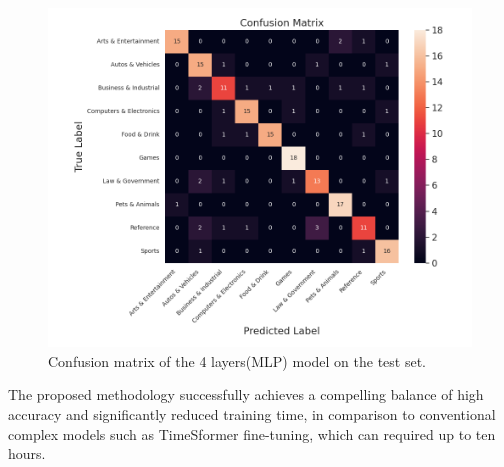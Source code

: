 \begin{figure}[t]
\begin{center}
   \includegraphics[width=0.8\linewidth]{asset/confusion_val.png} %
\end{center}
   \caption{Confusion matrix of the 4 layers(MLP) model on the test set.}
\label{fig:confusion_matrix}
\end{figure}


The proposed methodology successfully achieves a compelling balance of high accuracy and significantly reduced training time, in comparison to conventional complex models such as TimeSformer fine-tuning, which can required up to ten hours.